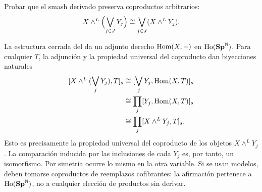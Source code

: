 \begin{ejer}\label{ejer:c18-smash-coproductos}
Probar que el smash derivado preserva coproductos arbitrarios:
\[
X\wedge^L\Bigl(\bigvee_{j\in J}Y_j\Bigr)
\cong\bigvee_{j\in J}(X\wedge^L Y_j).
\]
\end{ejer}
\begin{sol}
La estructura cerrada del  da un adjunto derecho $\operatorname{Hom}(X,-)$ en $\operatorname{Ho}(\mathbf{Sp}^{\mathbb N})$. Para cualquier $T$, la adjunción y la propiedad universal del coproducto dan biyecciones naturales
\[
\begin{aligned}
[X\wedge^L(\bigvee_jY_j),T]_s
&\cong[\bigvee_jY_j,\ihom(X,T)]_s\\
&\cong\prod_j[Y_j,\ihom(X,T)]_s\\
&\cong\prod_j[X\wedge^L Y_j,T]_s.
\end{aligned}
\]
Esto es precisamente la propiedad universal del coproducto de los objetos $X\wedge^L Y_j$. La comparación inducida por las inclusiones de cada $Y_j$ es, por tanto, un isomorfismo. Por simetría ocurre lo mismo en la otra variable. Si se usan modelos, deben tomarse coproductos de reemplazos cofibrantes: la afirmación pertenece a $\operatorname{Ho}(\mathbf{Sp}^{\mathbb N})$, no a cualquier elección de productos sin derivar.
\end{sol}

